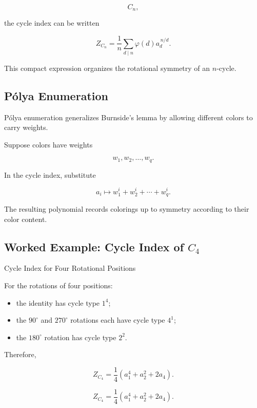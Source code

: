 \[
C_n,
\]

the cycle index can be written

\[
\boxed{
Z_{C_n}
=
\frac1n
\sum_{d\mid n}
\varphi(d)
a_d^{\,n/d}.
}
\]

This compact expression organizes the rotational symmetry of an
\(n\)-cycle.

\subsection{P\'olya Enumeration}
\label{subsec:polya-enumeration}

P\'olya enumeration generalizes Burnside's lemma by allowing different
colors to carry weights.

Suppose colors have weights

\[
w_1,w_2,\ldots,w_q.
\]

In the cycle index, substitute

\[
\boxed{
a_i
\longmapsto
w_1^i+w_2^i+\cdots+w_q^i.
}
\]

The resulting polynomial records colorings up to symmetry according to
their color content.

\subsection{Worked Example: Cycle Index of \(C_4\)}
\label{subsec:worked-cycle-index-c4}

\begin{workedexamplebox}{Cycle Index for Four Rotational Positions}

For the rotations of four positions:

\begin{itemize}
    \item the identity has cycle type \(1^4\);
    \item the \(90^\circ\) and \(270^\circ\) rotations each have cycle
          type \(4^1\);
    \item the \(180^\circ\) rotation has cycle type \(2^2\).
\end{itemize}

Therefore,

\[
Z_{C_4}
=
\frac14
\left(
a_1^4
+
a_2^2
+
2a_4
\right).
\]

\begin{answerbox}
\[
\boxed{
Z_{C_4}
=
\frac14
\left(
a_1^4+a_2^2+2a_4
\right).
}
\]
\end{answerbox}

\end{workedexamplebox}

